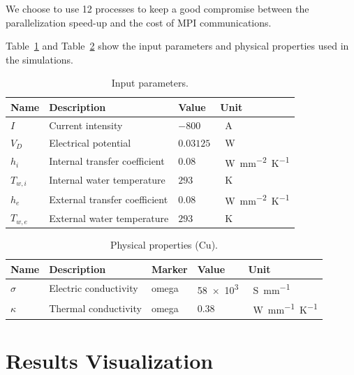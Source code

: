 \documentclass[12pt]{article}
\begin{document}
We choose to use 12 processes to keep a good compromise between the parallelization
speed-up and the cost of MPI communications.

Table~\ref{tab:input_parameters} and Table~\ref{tab:physical_properties} show the
input parameters and physical properties used in the simulations.

\begin{table}[H]
  \centering
  \renewcommand{\arraystretch}{1.5} %
  \begin{tabular}{p{1cm}p{6cm}p{2cm}p{2cm}}
    \toprule
    \textbf{Name} & \textbf{Description} & \textbf{Value} & \textbf{Unit} \\
    \midrule
    $I$ & Current intensity & $-800$ & \SI{}{\ampere} \\
    $V_D$ & Electrical potential & $0.03125$ & \SI{}{\watt} \\
    $h_i$ & Internal transfer coefficient & $0.08$ & \SI{}{\watt mm^{-2} \kelvin^{-1}}  \\
    $T_{w,i}$ & Internal water temperature & $293$ & \SI{}{\kelvin} \\
    $h_e$ & External transfer coefficient & $0.08$ & \SI{}{\watt mm^{-2} \kelvin^{-1}} \\
    $T_{w,e}$ & External water temperature & $293$ & \SI{}{\kelvin} \\
    \bottomrule
  \end{tabular}
  \caption{Input parameters.}
  \label{tab:input_parameters}
\end{table}

\begin{table}[H]
  \centering
  \renewcommand{\arraystretch}{1.5} %
  \begin{tabular}{p{1cm}p{5cm}p{3cm}p{2cm}p{2cm}}
    \toprule
    \textbf{Name} & \textbf{Description} & \textbf{Marker} & \textbf{Value} & \textbf{Unit} \\
    \midrule
    $\sigma$ & Electric conductivity & omega & \SI{58e3}{} & \SI{}{\siemens mm^{-1}} \\
    $\kappa$ & Thermal conductivity & omega & $0.38$ & \SI{}{\watt mm^{-1} \kelvin^{-1}} \\
    \bottomrule
  \end{tabular}
  \caption{Physical properties (Cu).}
  \label{tab:physical_properties}
\end{table}

\section{Results Visualization}
\end{document}
